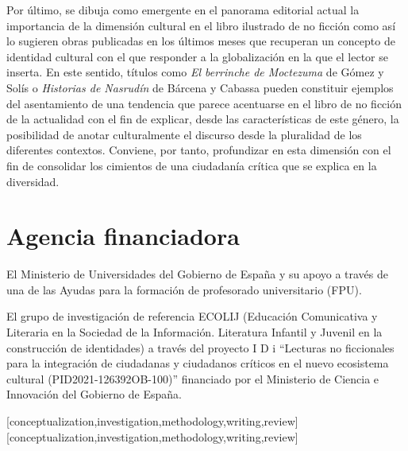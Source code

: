 \documentclass[spanish]{textolivre}
\begin{document}
Por último, se dibuja como emergente en el panorama editorial actual la importancia de la dimensión cultural \cite{schapers_especificidad_2016} en el libro ilustrado de no ficción como así lo sugieren obras publicadas en los últimos meses que recuperan un concepto de identidad cultural con el que responder a la globalización en la que el lector se inserta. En este sentido, títulos como \textit{El berrinche de Moctezuma} de Gómez y Solís o \textit{Historias de Nasrudín} de Bárcena y Cabassa pueden constituir ejemplos del asentamiento de una tendencia que parece acentuarse en el libro de no ficción de la actualidad con el fin de explicar, desde las características de este género, la posibilidad de anotar culturalmente el discurso desde la pluralidad de los diferentes contextos. Conviene, por tanto, profundizar en esta dimensión con el fin de consolidar los cimientos de una ciudadanía crítica que se explica en la diversidad.


\section{Agencia financiadora}\label{sec-conclusao}
El Ministerio de Universidades del Gobierno de España y su apoyo a través de una de las Ayudas para la formación de profesorado universitario (FPU).

El grupo de investigación de referencia ECOLIJ (Educación Comunicativa y Literaria en la Sociedad de la Información. Literatura Infantil y Juvenil en la construcción de identidades) a través del proyecto I D i “Lecturas no ficcionales para la integración de ciudadanas y ciudadanos críticos en el nuevo ecosistema cultural (PID2021-126392OB-100)” financiado por el Ministerio de Ciencia e Innovación del Gobierno de España.


\printbibliography\label{sec-bib}


\begin{contributors}
[conceptualization,investigation,methodology,writing,review]
[conceptualization,investigation,methodology,writing,review]
\end{contributors}
\end{document}
